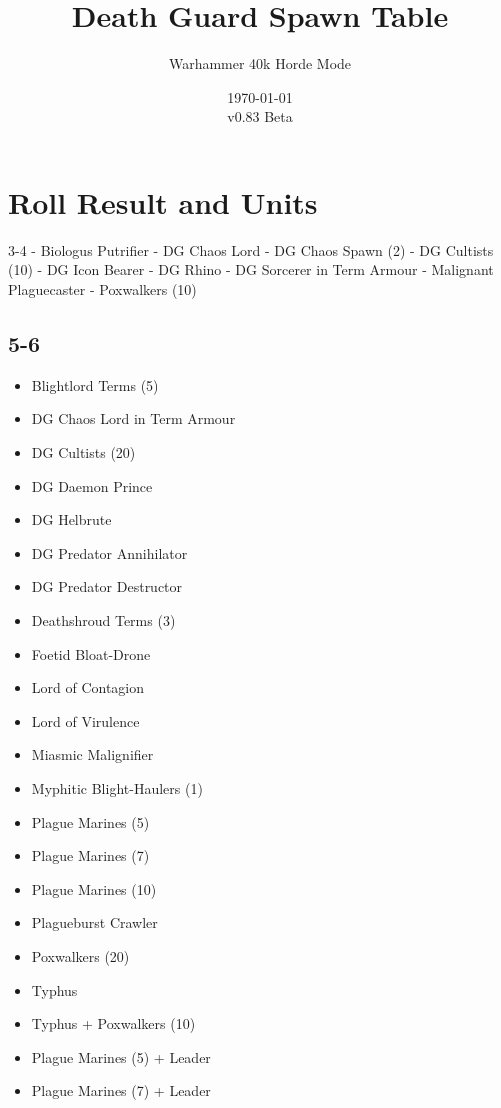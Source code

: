 \documentclass{HordeModeTarot}
\title{Death Guard Spawn Table}
\author{Warhammer 40k Horde Mode}
\date{\today \\v0.83 Beta}
\begin{document}
\maketitle

\outputUsingSpawnTableBoilerplate
\section{Roll Result and Units}\hypertarget{roll-results}{}\label{roll-results}

\begin{multicols}{2}

3-4
  - Biologus Putrifier
  - DG Chaos Lord
  - DG Chaos Spawn (2)
  - DG Cultists (10)
  - DG Icon Bearer
  - DG Rhino
  - DG Sorcerer in Term Armour
  - Malignant Plaguecaster
  - Poxwalkers (10)

\subsection*{5-6}

\begin{itemize}[leftmargin=*]
\item[] Blightlord Terms (5)
\item[] DG Chaos Lord in Term Armour
\item[] DG Cultists (20)
\item[] DG Daemon Prince
\item[] DG Helbrute
\item[] DG Predator Annihilator
\item[] DG Predator Destructor
\item[] Deathshroud Terms (3)
\item[] Foetid Bloat-Drone
\item[] Lord of Contagion
\item[] Lord of Virulence
\item[] Miasmic Malignifier
\item[] Myphitic Blight-Haulers (1)
\item[] Plague Marines (5)
\item[] Plague Marines (7)
\item[] Plague Marines (10)
\item[] Plagueburst Crawler
\item[] Poxwalkers (20)
\item[] Typhus
\item[] Typhus + Poxwalkers (10)
\item[] Plague Marines (5) + Leader
\item[] Plague Marines (7) + Leader
\end{itemize}


\end{multicols}
\end{document}
